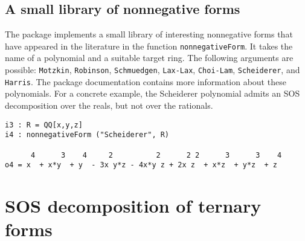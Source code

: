 \documentclass[11pt]{amsart}
\theoremstyle{plain}%
\theoremstyle{definition}
\theoremstyle{remark}
\begin{document}
\subsection*{A small library of nonnegative forms}
The package implements a small library of interesting nonnegative forms that have appeared in the literature in the function  \verb|nonnegativeForm|.
It takes the name of a polynomial and a suitable target ring.
The following arguments are possible: \verb|Motzkin|, \verb|Robinson|, \verb|Schmuedgen|, \verb|Lax-Lax|, \verb|Choi-Lam|, \verb|Scheiderer|, and \verb|Harris|.
The package documentation contains more information about these polynomials.
For a concrete example, the Scheiderer polynomial admits an SOS decomposition over the reals, but not over the rationals.
{\small
\begin{verbatim}
i3 : R = QQ[x,y,z]
i4 : nonnegativeForm ("Scheiderer", R)

      4      3    4     2          2      2 2      3      3    4
o4 = x  + x*y  + y  - 3x y*z - 4x*y z + 2x z  + x*z  + y*z  + z

\end{verbatim}
}


\section{SOS decomposition of ternary forms}
\end{document}
